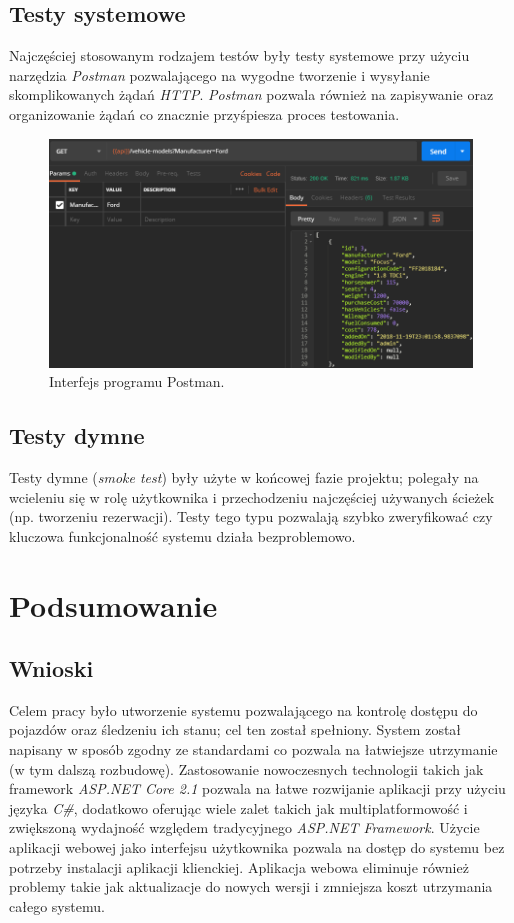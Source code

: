 \documentclass[eng,printmode,openany]{mgr}
\begin{document}
	\section{Testy systemowe}
	Najczęściej stosowanym rodzajem testów były testy systemowe przy użyciu narzędzia \textit{Postman} pozwalającego na wygodne tworzenie i wysyłanie skomplikowanych żądań \textit{HTTP}. \textit{Postman} pozwala również na zapisywanie oraz organizowanie żądań co znacznie przyśpiesza proces testowania.
	\begin{figure}[H]
		\centering
		\includegraphics[width=\textwidth]{images/tests_postman.png}
		\caption{Interfejs programu Postman.}
	\end{figure}
	\section{Testy dymne}
	Testy dymne (\textit{smoke test}) były użyte w końcowej fazie projektu; polegały na wcieleniu się w rolę użytkownika i przechodzeniu najczęściej używanych ścieżek (np. tworzeniu rezerwacji). Testy tego typu pozwalają szybko zweryfikować czy kluczowa funkcjonalność systemu działa bezproblemowo.
	
	\newpage
	\chapter{Podsumowanie}
	\section{Wnioski}
	Celem pracy było utworzenie systemu pozwalającego na kontrolę dostępu do pojazdów oraz śledzeniu ich stanu; cel ten został spełniony. System został napisany w sposób zgodny ze standardami co pozwala na łatwiejsze utrzymanie (w tym dalszą rozbudowę). Zastosowanie nowoczesnych technologii takich jak framework \textit{ASP.NET Core 2.1} pozwala na łatwe rozwijanie aplikacji przy użyciu języka \textit{C\#}, dodatkowo oferując wiele zalet takich jak multiplatformowość i zwiększoną wydajność względem tradycyjnego \textit{ASP.NET Framework}. Użycie aplikacji webowej jako interfejsu użytkownika pozwala na dostęp do systemu bez potrzeby instalacji aplikacji klienckiej. Aplikacja webowa eliminuje również problemy takie jak aktualizacje do nowych wersji i zmniejsza koszt utrzymania całego systemu.
	
\end{document}
